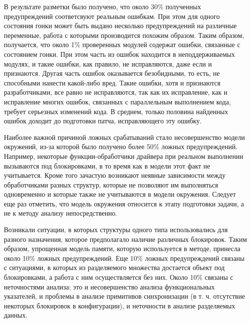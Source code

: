 В результате разметки было получено, что около 30\% полученных предупреждений соответсвуют реальным ошибкам. 
При этом для одного состояния гонки может быть выдано несколько предупреждений на различные переменные, работа с которыми производится похожим образом.
Таким образом, получается, что около 1\% проверенных модулей содержат ошибки, связанные с состоянием гонки.
При этом часть из ошибок находится в неподдерживаемых модулях, и такие ошибки, как правило, не исправляются, даже если и признаются. 
Другая часть ошибок оказывается безобидными, то есть, не способными нанести какой-либо вред.
Такие ошибки, хотя и признаются разработчиками, все равно не исправляются, так как их исправление, как и исправление многих ошибок, связанных с параллельным выполнением кода, требует серьезных изменений кода.
В среднем, только половина найденных ошибок доходит до подготовки патча, исправляющего эту ошибку.

Наиболее важной причиной ложных срабатываний стало несовершенство модели окружений, из-за которой было  получено  более  50\%  ложных  предупреждений.
Например,  некоторые функции-обработчики  драйвера  при  реальном  выполнении  вызываются  под блокировками, в то время как в модели этот факт не учитывается.
Кроме того зачастую  возникают  неявные  зависимости  между  обработчиками  разных структур,  которые  не  позволяют  им  выполняться одновременно  и  которые также  не  учитываются  в  модели  окружения.
Следует  еще  раз  отметить, что модель окружения относится к этапу подготовки задачи, а не к методу анализу непосредственно. 

Возникали  ситуации,  в  которых  структуры  одного  типа  использовались  для разного  назначения,  которое  предполагало  наличие  различных  блокировок. 
Таким образом, упрощенная модель памяти, которую используется в методе, принесла около 10\% ложных предупреждений. 
Еще 10\%  ложных  предупреждений  связаны  с  ситуациями,  в  которых  из разделяемого множества достается объект под блокировками, а работа с ним 
осуществляется  без них.
Около 10\% связаны с  неточностями анализа: это и несовершенство анализа функциональных указателей, и проблемы в анализе примитивов  синхронизации  (в т. ч. отсутствие некоторых  блокировок  в конфигурации), и неточности в анализе разделяемых данных.  

